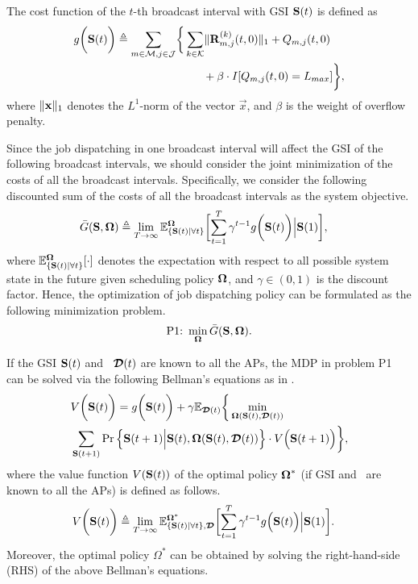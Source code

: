 \begin{definition}
    The cost function of the $t$-th broadcast interval with GSI $\mathbf{S}(t)$ is defined as
    {\small
    \begin{align}
        g\Paren{\Stat(t)} \define
            \sum_{m\in\esSet,j\in\jSpace}
            \Brace{&
                \sum_{k\in\apSet} \Inorm{\vec{R}^{(k)}_{m,j}(t,0)} + Q_{m,j}(t,0)
                \nonumber\\
                &~~~~~+ \beta \cdot I[Q_{m,j}(t,0)=L_{max}]
            },
    \end{align}
    }where $\lVert\mathbf{x}\|_1$ denotes the $L^1$-norm of the vector $\vec{x}$, and $\beta$ is the weight of overflow penalty.
\end{definition}

Since the job dispatching in one broadcast interval will affect the GSI of the following broadcast intervals, we should consider the joint minimization of the costs of all the broadcast intervals.
Specifically, we consider the following discounted sum of the costs of all the broadcast intervals as the system objective.
{\small
\begin{align}
    &\bar{G}(\Stat, \Policy) \define
    \lim_{T \to \infty} \mathbb{E}^{\Policy}_{\set{\Stat(t)|\forall t}}
    \Bracket{
        \sum_{t=1}^{T} \gamma^{t-1} g\Paren{\Stat(t)} \Big| \Stat(1)
    },
\end{align}
}where $\mathbb{E}^{\boldsymbol{\Omega}}_{\{\mathbf{S}(t)|\forall t\}}[\cdot]$ denotes the expectation with respect to all possible system state in the future given scheduling policy $\boldsymbol{\Omega}$, and $\gamma \in (0,1)$ is the discount factor.
Hence, the optimization of job dispatching policy can be formulated as the following minimization problem.
\begin{align}
    \text{P1:}~
    \min_{\boldsymbol{\Omega}} \bar{G}(\mathbf{S}, \boldsymbol{\Omega}).
\end{align}

If the GSI $\mathbf{S}(t)$ and \brlatency~$\boldsymbol{\mathcal{D}}(t)$ are known to all the APs, the MDP in problem P1 can be solved via the following Bellman's equations as in \cite{sutton1998}.
\begin{align}
    &V\bigg(\mathbf{S}(t)\bigg) =g\bigg(\mathbf{S}(t)\bigg)
        + \gamma\mathbb{E}_{\boldsymbol{\mathcal{D}}(t)}\bigg\{
            \min_{\boldsymbol{\Omega}(\mathbf{S}(t),\boldsymbol{\mathcal{D}}(t))}
            \nonumber\\
            &\sum_{\mathbf{S}(t+1)} \Pr \Big\{ 
                \mathbf{S}(t+1) \Big| \mathbf{S}(t), \boldsymbol{\Omega}(\mathbf{S}(t), \boldsymbol{\mathcal{D}}(t)) \Big\} \cdot V\Big(\mathbf{S}(t+1)\Big)
            \bigg\},
    \label{eqn:sp_0}
\end{align}
where the value function $V(\mathbf{S}(t))$ of the optimal policy $\boldsymbol{\Omega}^{*}$ (if GSI and \brlatency~are known to all the APs) is defined as follows.
\begin{align}
    &V\Paren{\Stat(t)} \define
    \lim_{T\to\infty} 
    \mathbb{E}^{\Policy^*}_{\set{\Stat(t)|\forall t}, \Delay} \Bracket{
        \sum_{t=1}^{T} \gamma^{t-1} g\Big( \Stat(t) \Big) \Big| \Stat(1)
    }.
    \label{eqn:val_f}
\end{align}
Moreover, the optimal policy $\Omega^{*}$ can be obtained by solving the right-hand-side (RHS) of the above Bellman's equations.

